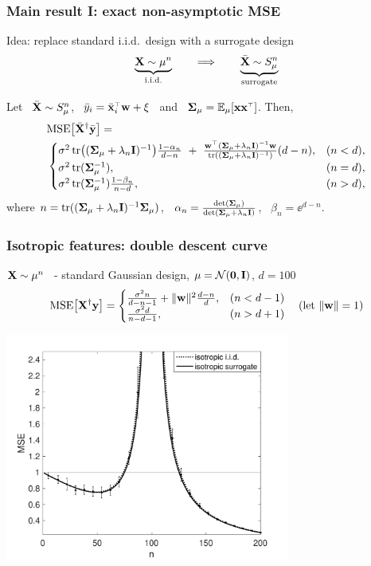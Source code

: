 \documentclass{beamer}
\begin{document}
\begin{frame}
  \frametitle{Main result I: exact non-asymptotic MSE}
  Idea: replace standard i.i.d.~design with a surrogate design
  \begin{align*}
    \underbrace{\mathbf X\sim\mu^n}_{\text{i.i.d.}}\qquad\Longrightarrow\qquad
    \underbrace{{\bar{\mathbf X}}\sim S_\mu^n}_{\text{surrogate}} 
  \end{align*}
  \pause\vspace{-2mm}
  \begin{theorem}
\label{t:mse}
Let \ ${\bar{\mathbf X}}\sim S_\mu^n$, \ $\yb_i=\xbb_i^\top\w+\xi$ \ and \
$\Sigmab_\mu=\E_\mu[\x\x^\top]$. Then,\pause
  \begin{align*}
 &\MSE{\Xb^\dagger\ybb} =\\
  &  \begin{cases}
    \sigma^2\,\tr\big((\Sigmab_\mu+\lambda_n\I)^{-1}\big)
    \frac{1-\alpha_n}{d-n}\ +\
\frac{\w^{\top}(\Sigmab_\mu+\lambda_n\I)^{-1}\w}
{\tr((\Sigmab_\mu+\lambda_n\I)^{-1})}(d-n),
& (n<d),\\
\sigma^2\, \tr(\Sigmab_\mu^{-1}),& (n=d),\\
\sigma^2\,\tr(\Sigmab_\mu^{-1})\frac{1-\beta_n}{n-d},&(n>d),
\end{cases}
  \end{align*}\pause
  where
  $n=\mathrm{tr}((\mathbf{\Sigma}_\mu+\lambda_n\mathbf I)^{-1}\mathbf{\Sigma}_\mu)$, \
  $\alpha_n=\frac{\det(\mathbf{\Sigma}_\mu)}{\det(\mathbf{\Sigma}_\mu+\lambda_n\mathbf I)}$,
\ $\beta_n=\ee^{d-n}$.
\end{theorem}
\end{frame}

\begin{frame}
  \frametitle{Isotropic features: double descent curve}
  $\mathbf X\sim\mu^n$ \ - standard Gaussian design, $\mu=\mathcal{N}(\mathbf 0,\mathbf I)$, $d=100$
  \pause
      \begin{align*}
        {\mathrm{MSE}\big[\mathbf X^\dagger\mathbf y\big]} =
        \begin{cases}
          \frac{\sigma^2n}{d-n-1} + \|\mathbf w\|^2\frac{d-n}{d},&(n<d-1)\\
          \frac{\sigma^2d}{n-d-1},&(n>d+1)
        \end{cases}\quad(\text{let }\|\mathbf w\|=1)
      \end{align*}
      \pause\vspace{-2mm}
      \begin{center}
        \includegraphics[width=0.7\textwidth]{../figs/descent-isotropic}
        \end{center}
\end{frame}
\end{document}
